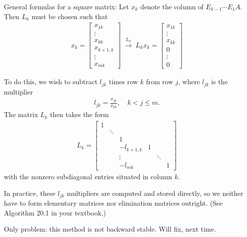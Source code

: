 \documentclass{ximera}
\begin{document}
\vspace{0.2in}

General formulas for a square matrix:
Let $x_k$ denote the column of $E_{k-1} \cdots E_1A$.  Then $L_k$ must be chosen such that
\begin{align*}
    x_k = \begin{bmatrix}
        x_{1k} \\ \vdots \\ x_{kk} \\ x_{k+1,k} \\ \vdots\\ x_{mk}
    \end{bmatrix} \;
    \stackrel{L_k}{\rightarrow} \; L_kx_k = \begin{bmatrix}
        x_{1k} \\ \vdots \\ x_{kk} \\ 0 \\ \vdots \\0
    \end{bmatrix}
\end{align*}

To do this, we wish to subtract $l_{jk}$ times row $k$ from row $j$, where $l_{jk}$ is the multiplier 
\begin{align*}
    l_{jk} = \frac{x_{jk}}{x_{kk}}, \quad k < j \leq m.
\end{align*}
The matrix $L_k$ then takes the form
\begin{align*}
    L_k = \begin{bmatrix}
        1 & & & & & \\
         & \ddots & & & & \\
         & & 1 &&&\\
         && -l_{k+1,k} & 1 & & \\
         &&\vdots&& \ddots &\\
         && -l_{mk} &&& 1
    \end{bmatrix}
\end{align*}
with the nonzero subdiagonal entries situated in column $k$.

In practice, these $l_{jk}$ multipliers are computed and stored directly, so we neither have to form elementary matrices nor elimination matrices outright.  (See Algorithm 20.1 in your textbook.)

Only problem: this method is not backward stable.  Will fix, next time.
\end{document}

